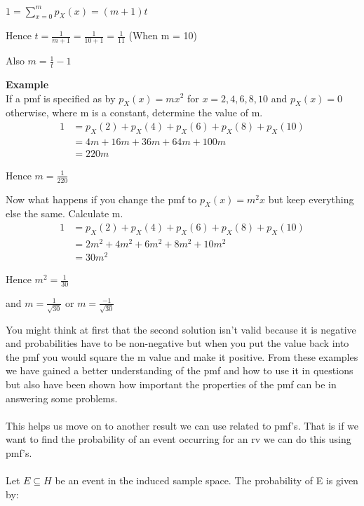 \documentclass[,oneside]{article}
\begin{document}
\begin{enumerate}
\begin{center}
$1 = \sum\limits_{x=0}^{m} p_X(x)=(m+1)t$
\end{center}
\begin{center}
Hence $t = \frac{1}{m+1} = \frac{1}{10+1}=\frac{1}{11}$ (When m = 10)
\end{center}
\begin{center}
Also $m = \frac{1}{t}-1$
\end{center}
\textbf{Example}\\
If a pmf is specified as by $p_X(x)=mx^2$ for $x = 2,4,6,8,10$ and $p_X(x) = 0$ otherwise, where m is a constant, determine the value of m.
\begin{align*}
1 &= p_X(2) + p_X(4) + p_X(6) + p_X(8) + p_X(10) \\
&= 4m+16m+36m+64m+100m\\
&=220m
\end{align*}
\begin{center}
Hence $m = \frac{1}{220}$
\end{center}
Now what happens if you change the pmf to $p_X(x)=m^2x$ but keep everything else the same. Calculate m.
\begin{align*}
1 &= p_X(2) + p_X(4) + p_X(6) + p_X(8) + p_X(10) \\
&= 2m^2+4m^2+6m^2+8m^2+10m^2\\
&=30m^2
\end{align*}
\begin{center}
Hence $m^2 = \frac{1}{30}$
\end{center}
\begin{center}
and $m = \frac{1}{\sqrt{30}}$ or $m = \frac{-1}{\sqrt{30}}$ 
\end{center}
You might think at first that the second solution isn't valid because it is negative and probabilities have to be non-negative but when you put the value back into the pmf you would square the m value and make it positive. From these examples we have gained a better understanding of the pmf and how to use it in questions but also have been shown how important the properties of the pmf can be in answering some problems.\\ \\
This helps us move on to another result we can use related to pmf's. That is if we want to find the probability of an event occurring for an rv we can do this using pmf's.\\ \\
Let $E \subseteq H$ be an event in the induced sample space. The probability of E is given by:\\

\end{enumerate}
\end{document}

